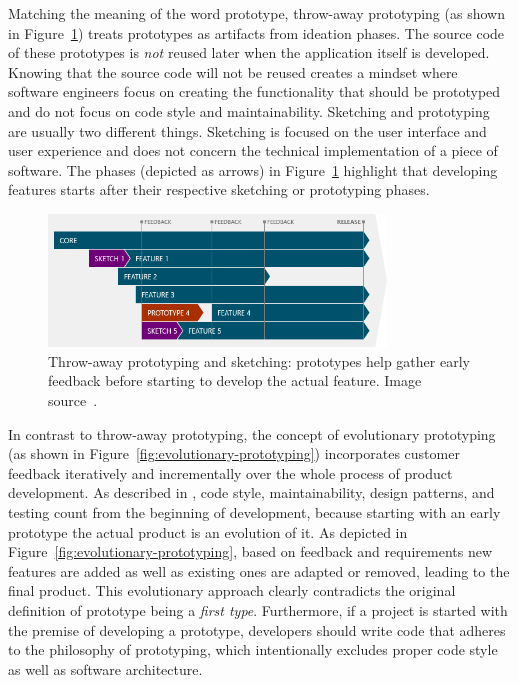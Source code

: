 Matching the meaning of the word prototype, throw-away prototyping (as shown in Figure~\ref{fig:throw-away-prototyping}) treats prototypes as artifacts from ideation phases.
The source code of these prototypes is \emph{not} reused later when the application itself is developed.
Knowing that the source code will not be reused creates a mindset where software engineers focus on creating the functionality that should be prototyped and do not focus on code style and maintainability.
Sketching and prototyping are usually two different things.
Sketching is focused on the user interface and user experience and does not concern the technical implementation of a piece of software.
The phases (depicted as arrows) in Figure~\ref{fig:throw-away-prototyping} highlight that developing features starts after their respective sketching or prototyping phases.
%
\begin{figure}[h]
\centering
\includegraphics[width=0.8\textwidth]{images/throw-away-prototyping}
\caption{Throw-away prototyping and sketching: prototypes help gather early feedback before starting to develop the actual feature. Image source~\cite{mourzenko_answer_2014}.}
\label{fig:throw-away-prototyping}
\end{figure}
%
In contrast to throw-away prototyping, the concept of evolutionary prototyping (as shown in Figure~\ref{fig:evolutionary-prototyping}) incorporates customer feedback iteratively and incrementally over the whole process of product development.
As described in \cite{mourzenko_answer_2014}, code style, maintainability, design patterns, and testing count from the beginning of development, because starting with an early prototype the actual product is an evolution of it.
As depicted in Figure~\ref{fig:evolutionary-prototyping}, based on feedback and requirements new features are added as well as existing ones are adapted or removed, leading to the final product.
This evolutionary approach clearly contradicts the original definition of prototype being a \emph{first type}.
Furthermore, if a project is started with the premise of developing a prototype, developers should write code that adheres to the philosophy of prototyping, which intentionally excludes proper code style as well as software architecture.
